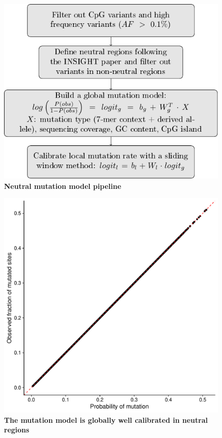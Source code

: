 \documentclass{article}
\begin{document}

\begin{figure}
    \centering
    \includegraphics[width=0.8\linewidth]{supplemental_figures/neutral_mutation_model_pipeline.pdf}
    \caption{\textbf{Neutral mutation model pipeline}}
    \label{fig:mutation_model_pipeline}
\end{figure}

\begin{figure}
    \centering
    \includegraphics[width = 0.5\linewidth]{supplemental_figures/mutation_model_calibration.pdf}
    \caption{\textbf{The mutation model is globally well calibrated in neutral regions}}
    \label{fig:mutation_model_calibration}
\end{figure}
\end{document}
